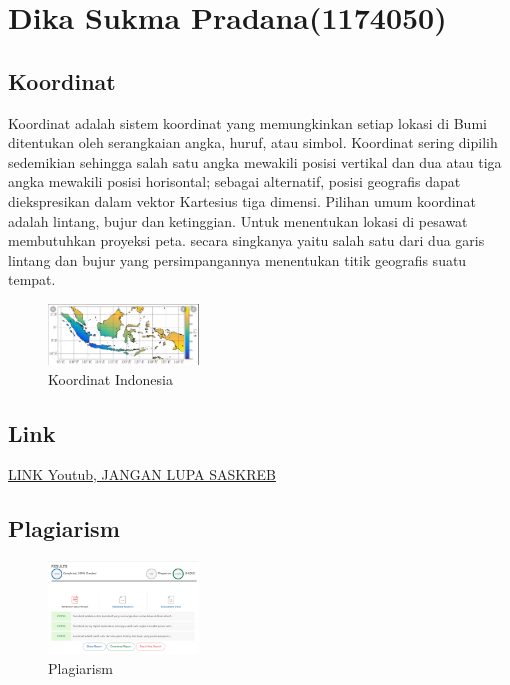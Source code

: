 \section{Dika Sukma Pradana(1174050)}

\subsection{Koordinat}
\par
Koordinat adalah sistem koordinat yang memungkinkan setiap lokasi di Bumi ditentukan oleh serangkaian angka, huruf, atau simbol. Koordinat sering dipilih sedemikian sehingga salah satu angka mewakili posisi vertikal dan dua atau tiga angka mewakili posisi horisontal; sebagai alternatif, posisi geografis dapat diekspresikan dalam vektor Kartesius tiga dimensi. Pilihan umum koordinat adalah lintang, bujur dan ketinggian. Untuk menentukan lokasi di pesawat membutuhkan proyeksi peta. secara singkanya yaitu salah satu dari dua garis lintang dan bujur yang persimpangannya menentukan titik geografis suatu tempat.


\begin{figure}[H]
	\includegraphics[width=4cm]{figures/1174050/koordinat.png}
	\centering
	\caption{Koordinat Indonesia}
\end{figure}

\subsection{Link}
\href{https://www.youtube.com/watch?v=GnI25H4HATo}{LINK Youtub, JANGAN LUPA SASKREB}
\subsection{Plagiarism}
\begin{figure}[H]
	\includegraphics[width=4cm]{figures/1174050/plagiarism.png}
	\centering
	\caption{Plagiarism}
\end{figure}
